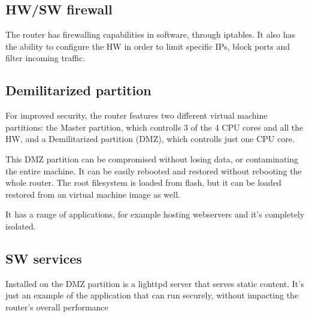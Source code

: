 \subsection{HW/SW firewall}
\label{sub-sec:hw-firewall}
The router has firewalling capabilities in software, through iptables.
It also has the ability to configure the HW in order to limit specific IPs,
block ports and filter incoming traffic.

\subsection{Demilitarized partition}
\label{sub-sec:dmz}
For improved security, the router features two different virtual machine
partitions: the Master partition, which controlls 3 of the 4 CPU cores
and all the HW, and a Demilitarized partition (DMZ), which controlls just one
CPU core.

This DMZ partition can be compromised without losing data, or contaminating
the entire machine. It can be easily rebooted and restored without 
rebooting the whole router. The root filesystem is loaded from flash, 
but it can be loaded restored from an virtual machine image as well.

It has a range of applications, for example hosting webservers and it's
completely isolated.

\subsection{SW services}
\label{sub-sec:sw-services}
Installed on the DMZ partition is a lighttpd server that serves static content.
It's just an example of the application that can run securely, without
impacting the router's overall performance
